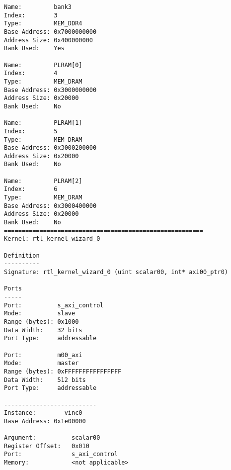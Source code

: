 \begin{lstlisting}[label=lst:code_3,caption=Содержимое файла  vinc\_xclbin\_info]
Name:         bank3
Index:        3
Type:         MEM_DDR4
Base Address: 0x7000000000
Address Size: 0x400000000
Bank Used:    Yes

Name:         PLRAM[0]
Index:        4
Type:         MEM_DRAM
Base Address: 0x3000000000
Address Size: 0x20000
Bank Used:    No

Name:         PLRAM[1]
Index:        5
Type:         MEM_DRAM
Base Address: 0x3000200000
Address Size: 0x20000
Bank Used:    No

Name:         PLRAM[2]
Index:        6
Type:         MEM_DRAM
Base Address: 0x3000400000
Address Size: 0x20000
Bank Used:    No
========================================================
Kernel: rtl_kernel_wizard_0

Definition
----------
Signature: rtl_kernel_wizard_0 (uint scalar00, int* axi00_ptr0)

Ports
-----
Port:          s_axi_control
Mode:          slave
Range (bytes): 0x1000
Data Width:    32 bits
Port Type:     addressable

Port:          m00_axi
Mode:          master
Range (bytes): 0xFFFFFFFFFFFFFFFF
Data Width:    512 bits
Port Type:     addressable

--------------------------
Instance:        vinc0
Base Address: 0x1e00000

Argument:          scalar00
Register Offset:   0x010
Port:              s_axi_control
Memory:            <not applicable>


\end{lstlisting}
